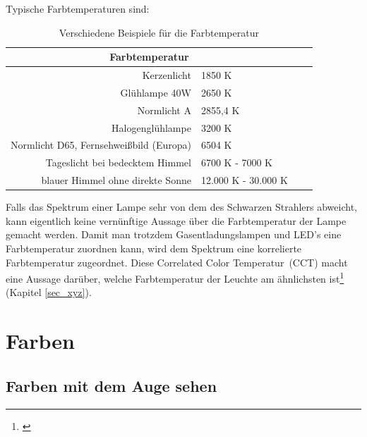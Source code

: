 Typische Farbtemperaturen sind:

\begin{table}[htp] 
		\centering
		\begin{tabular}{rlcc}  %
		\toprule
		\multicolumn{2}{c}{\large\sffamily Farbtemperatur}\\ 							
		\midrule
		Kerzenlicht & 1850 K\\
		Glühlampe 40W & 2650 K\\
		Normlicht A & 2855,4 K\\
		Halogenglühlampe & 3200 K\\
		Normlicht D65, Fernsehweißbild (Europa) & 6504 K\\
		Tageslicht bei bedecktem Himmel & 6700 K - 7000 K\\
		blauer Himmel ohne direkte Sonne & 12.000 K - 30.000 K\\
		\bottomrule
		\end{tabular}
		\caption{Verschiedene Beispiele für die Farbtemperatur\protect\footnotemark}	
		\label{t_candela}
	\end{table}


Falls das Spektrum einer Lampe sehr von dem des Schwarzen Strahlers abweicht, kann eigentlich keine vernünftige Aussage über die Farbtemperatur der Lampe gemacht werden. Damit man trotzdem Gasentladungslampen und LED's eine Farbtemperatur zuordnen kann, wird dem Spektrum eine korrelierte Farbtemperatur zugeordnet. Diese \glqq Correlated Color Temperatur\grqq\ (CCT) macht eine Aussage darüber, welche Farbtemperatur der Leuchte am ähnlichsten ist\footnote{\cite[91]{mueller}} (Kapitel \ref{sec_xyz}).

\chapter{Farben}


\section{Farben mit dem Auge sehen} \label{sec_auge}

